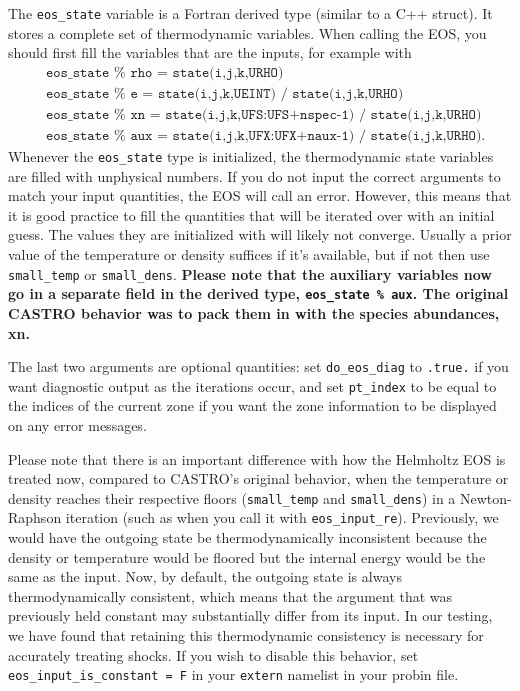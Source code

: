 The \texttt{eos\_state} variable is a Fortran derived type (similar to a C++ struct). It stores a complete set of thermodynamic variables. When calling the EOS, you should first fill the variables that are the inputs, for example with
\begin{align*}
  &\texttt{eos\_state } \% \texttt{ rho = state(i,j,k,URHO)} \\
  &\texttt{eos\_state } \% \texttt{ e   = state(i,j,k,UEINT) / state(i,j,k,URHO)} \\
  &\texttt{eos\_state } \% \texttt{ xn  = state(i,j,k,UFS:UFS+nspec-1) / state(i,j,k,URHO)} \\
  &\texttt{eos\_state } \% \texttt{ aux = state(i,j,k,UFX:UFX+naux-1) / state(i,j,k,URHO)}.
\end{align*}
Whenever the \texttt{eos\_state} type is initialized, the
thermodynamic state variables are filled with unphysical numbers. If
you do not input the correct arguments to match your input quantities,
the EOS will call an error. However, this means that it is good
practice to fill the quantities that will be iterated over with an
initial guess. The values they are initialized with will likely not
converge. Usually a prior value of the temperature or density suffices
if it's available, but if not then use \texttt{small\_temp} or
\texttt{small\_dens}. \textbf{Please note that the auxiliary variables
  now go in a separate field in the derived type, {\tt eos\_state \%
  aux}. The original CASTRO behavior was to pack them in with the
  species abundances, xn.}

The last two arguments are optional quantities: set \texttt{do\_eos\_diag} to \texttt{.true.} if you want diagnostic output as the iterations occur, and set \texttt{pt\_index} to be equal to the indices of the current zone if you want the zone information to be displayed on any error messages.

Please note that there is an important difference with how the Helmholtz EOS is treated now, compared to CASTRO's original behavior, when the temperature or density reaches their respective floors (\texttt{small\_temp} and \texttt{small\_dens}) in a Newton-Raphson iteration (such as when you call it with \texttt{eos\_input\_re}). Previously, we would have the outgoing state be thermodynamically inconsistent because the density or temperature would be floored but the internal energy would be the same as the input. Now, by default, the outgoing state is always thermodynamically consistent, which means that the argument that was previously held constant may substantially differ from its input. In our testing, we have found that retaining this thermodynamic consistency is necessary for accurately treating shocks. If you wish to disable this behavior, set \texttt{eos\_input\_is\_constant = F} in your \texttt{extern} namelist in your probin file.

